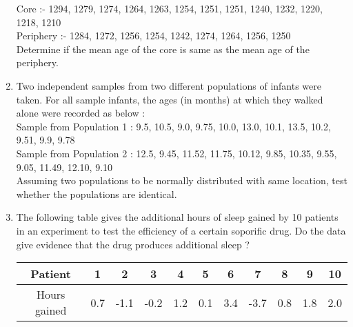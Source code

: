 \documentclass[11pt, a4paper]{article}
\begin{document}
\begin{enumerate}
Core :- 1294, 1279, 1274, 1264, 1263, 1254, 1251, 1251, 1240, 1232, 1220, 1218, 1210 \\

Periphery :- 1284, 1272, 1256, 1254, 1242, 1274, 1264, 1256, 1250 \\

Determine if the mean age of the core is same as the mean age of the periphery.







\item Two independent samples from two different populations of infants were taken. For all sample infants, the ages (in months) at which they walked alone were recorded as below : \\

Sample from Population 1 : 9.5, 10.5, 9.0, 9.75, 10.0, 13.0, 10.1, 13.5, 10.2, 9.51, 9.9, 9.78 \\

Sample from Population 2 : 12.5, 9.45, 11.52, 11.75, 10.12, 9.85, 10.35, 9.55, 9.05, 11.49, 12.10, 9.10 \\

Assuming two populations to be normally distributed with same location, test whether the populations are identical.




\pagebreak



\item The following table gives the additional hours of sleep gained by 10 patients in an experiment to test the efficiency of a certain soporific drug. Do the data give evidence that the drug produces additional sleep ?


\begin{table}[h]
\def\arraystertch{1.5}

\begin{center}
\begin{tabular}{|c|cccccccccc|}

\hline

Patient & 1 & 2 & 3 & 4 & 5 & 6 & 7 & 8 & 9 & 10 \\

\hline

Hours gained & 0.7 & -1.1 & -0.2 & 1.2 & 0.1 & 3.4 & -3.7 & 0.8 & 1.8 & 2.0 \\

\hline

\end{tabular}
\end{center}


\end{table}
\end{enumerate}
\end{document}
